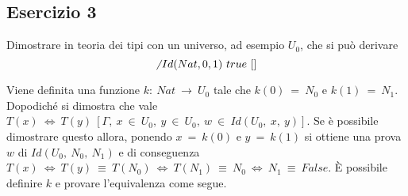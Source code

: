 \subsection{Esercizio 3}
\begin{thm}
	Dimostrare in teoria dei tipi con un universo, ad esempio $U_0$, che si può derivare
	\[\not~Id(Nat, 0, 1)~true~[]\]
\end{thm}
Viene definita una funzione $k:~Nat~\to~U_0$ tale che $k(0)~=~N_0$ e $k(1)~=~N_1$. Dopodiché si dimostra che vale $T(x)~\iff~T(y)~[\Gamma,~x~\in~U_0,~y~\in~U_0,~w~\in~Id(U_0,~x,~y)]$. Se è possibile dimostrare questo allora, ponendo $x~=~k(0)$ e $y~=~k(1)$ si ottiene una prova $w$ di $Id(U_0,~N_0,~N_1)$ e di conseguenza $T(x)~\iff~T(y)~\equiv~T(N_0)~\iff~T(N_1)~\equiv~N_0~\iff~N_1~\equiv~False$. È possibile definire $k$ e provare l'equivalenza come segue.
